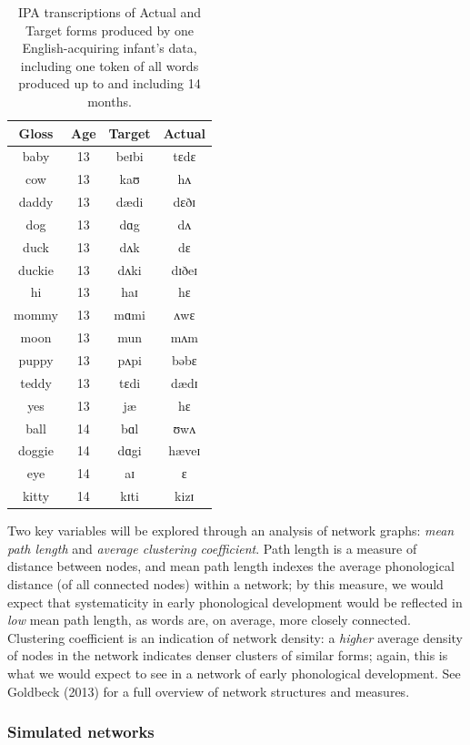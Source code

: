 \documentclass[
  man]{apa6}
\begin{document}
\begin{longtable}[t]{cccc}
\caption{\label{tab:Table-IPA-egs}IPA transcriptions of Actual and Target forms produced by one English-acquiring infant's data, including one token of all words produced up to and including 14 months.}\\
\toprule
Gloss & Age & Target & Actual\\
\midrule
baby & 13 & beɪbi & tɛdɛ\\
cow & 13 & kaʊ & hʌ\\
daddy & 13 & dædi & dɛðɪ\\
dog & 13 & dɑg & dʌ\\
duck & 13 & dʌk & dɛ\\
\addlinespace
duckie & 13 & dʌki & dɪðeɪ\\
hi & 13 & haɪ & hɛ\\
mommy & 13 & mɑmi & ʌwɛ\\
moon & 13 & mun & mʌm\\
puppy & 13 & pʌpi & bəbɛ\\
\addlinespace
teddy & 13 & tɛdi & dædɪ\\
yes & 13 & jæ & hɛ\\
ball & 14 & bɑl & ʊwʌ\\
doggie & 14 & dɑgi & hæveɪ\\
eye & 14 & aɪ & ɛ\\
\addlinespace
kitty & 14 & kɪti & kizɪ\\
\bottomrule
\end{longtable}

Two key variables will be explored through an analysis of network graphs: \emph{mean path length} and \emph{average clustering coefficient}. Path length is a measure of distance between nodes, and mean path length indexes the average phonological distance (of all connected nodes) within a network; by this measure, we would expect that systematicity in early phonological development would be reflected in \emph{low} mean path length, as words are, on average, more closely connected. Clustering coefficient is an indication of network density: a \emph{higher} average density of nodes in the network indicates denser clusters of similar forms; again, this is what we would expect to see in a network of early phonological development. See Goldbeck (2013) for a full overview of network structures and measures.

\subsubsection{Simulated networks}\label{simulated-networks}
\end{document}
